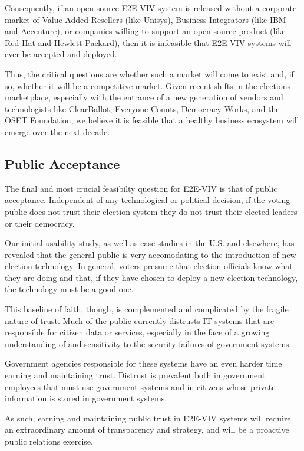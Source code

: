 Consequently, if an open source E2E-VIV system is released without a
corporate market of Value-Added Resellers (like Unisys), Business
Integrators (like IBM and Accenture), or companies willing to support
an open source product (like Red Hat and Hewlett-Packard), then it is
infeasible that E2E-VIV systems will ever be accepted and deployed.

Thus, the critical questions are whether such a market will come to
exist and, if so, whether it will be a competitive market. Given
recent shifts in the elections marketplace, especially with the
entrance of a new generation of vendors and technologists like
ClearBallot, Everyone Counts, Democracy Works, and the OSET
Foundation, we believe it is feasible that a healthy business
ecosystem will emerge over the next decade.

\subsection{Public Acceptance}

The final and most crucial feasibilty question for E2E-VIV is that of
public acceptance.  Independent of any technological or political
decision, if the voting public does not trust their election system
they do not trust their elected leaders or their democracy.

Our initial usability study, as well as case studies in the U.S. and
elsewhere, has revealed that the general public is very accomodating
to the introduction of new election technology.  In general, voters
presume that election officials know what they are doing and that, if
they have chosen to deploy a new election technology, the technology
must be a good one.

This baseline of faith, though, is complemented and complicated by the
fragile nature of trust. Much of the public currently distrusts IT
systems that are responsible for citizen data or services, especially
in the face of a growing understanding of and sensitivity to the
security failures of government systems.

Government agencies responsible for these systems have an even harder
time earning and maintaining trust.  Distrust is prevalent both in
government employees that must use government systems and in citizens
whose private information is stored in government systems.

As such, earning and maintaining public trust in E2E-VIV systems will
require an extraordinary amount of transparency and strategy, and will
be a proactive public relations exercise.

